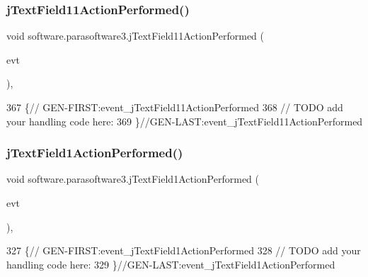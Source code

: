 \subsubsection{\texorpdfstring{j\+Text\+Field11\+Action\+Performed()}{jTextField11ActionPerformed()}}
{\footnotesize\ttfamily void software.\+parasoftware3.\+j\+Text\+Field11\+Action\+Performed (\begin{DoxyParamCaption}\item[{java.\+awt.\+event.\+Action\+Event}]{evt }\end{DoxyParamCaption})\hspace{0.3cm}{\ttfamily [inline]}, {\ttfamily [private]}}


\begin{DoxyCode}
367                                                                              \{\textcolor{comment}{//
      GEN-FIRST:event\_jTextField11ActionPerformed}
368         \textcolor{comment}{// TODO add your handling code here:}
369     \}\textcolor{comment}{//GEN-LAST:event\_jTextField11ActionPerformed}
\end{DoxyCode}
\mbox{\label{classsoftware_1_1parasoftware3_a0cfede9cef6efbcec21f11c242a315c6}} 
\subsubsection{\texorpdfstring{j\+Text\+Field1\+Action\+Performed()}{jTextField1ActionPerformed()}}
{\footnotesize\ttfamily void software.\+parasoftware3.\+j\+Text\+Field1\+Action\+Performed (\begin{DoxyParamCaption}\item[{java.\+awt.\+event.\+Action\+Event}]{evt }\end{DoxyParamCaption})\hspace{0.3cm}{\ttfamily [inline]}, {\ttfamily [private]}}


\begin{DoxyCode}
327                                                                             \{\textcolor{comment}{//
      GEN-FIRST:event\_jTextField1ActionPerformed}
328         \textcolor{comment}{// TODO add your handling code here:}
329     \}\textcolor{comment}{//GEN-LAST:event\_jTextField1ActionPerformed}
\end{DoxyCode}
\mbox{\label{classsoftware_1_1parasoftware3_a2ff1159c69e5fefd7c2582b2e14db77a}} 
